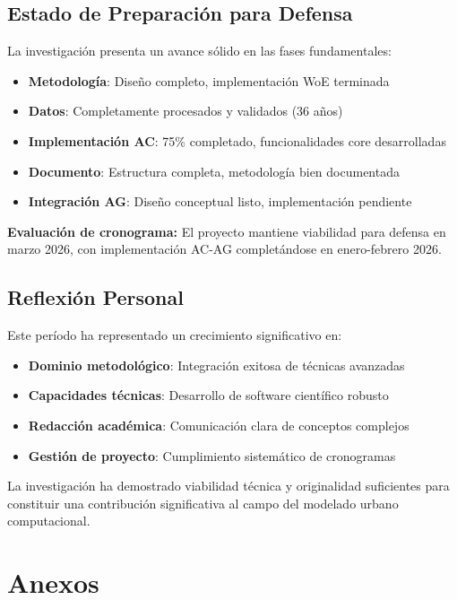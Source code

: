 \documentclass[12pt,letterpaper]{article}
\begin{document}
\subsection{Estado de Preparación para Defensa}

La investigación presenta un avance sólido en las fases fundamentales:

\begin{itemize}
\item \textbf{Metodología}: Diseño completo, implementación WoE terminada
\item \textbf{Datos}: Completamente procesados y validados (36 años)
\item \textbf{Implementación AC}: 75\% completado, funcionalidades core desarrolladas
\item \textbf{Documento}: Estructura completa, metodología bien documentada
\item \textbf{Integración AG}: Diseño conceptual listo, implementación pendiente
\end{itemize}

\textbf{Evaluación de cronograma:} El proyecto mantiene viabilidad para defensa en marzo 2026, con implementación AC-AG completándose en enero-febrero 2026.

\subsection{Reflexión Personal}

Este período ha representado un crecimiento significativo en:
\begin{itemize}
\item \textbf{Dominio metodológico}: Integración exitosa de técnicas avanzadas
\item \textbf{Capacidades técnicas}: Desarrollo de software científico robusto
\item \textbf{Redacción académica}: Comunicación clara de conceptos complejos
\item \textbf{Gestión de proyecto}: Cumplimiento sistemático de cronogramas
\end{itemize}

La investigación ha demostrado viabilidad técnica y originalidad suficientes para constituir una contribución significativa al campo del modelado urbano computacional.

\section*{Anexos}
\end{document}

